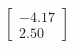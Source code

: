 \documentclass[preview]{standalone}
\begin{document}
\begin{align*}
\begin{bmatrix} -4.17 \\ 2.50 \end{bmatrix}
\end{align*}
\end{document}
